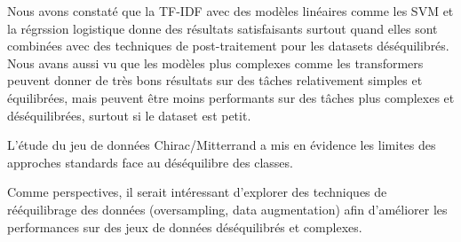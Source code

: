 \documentclass{article}
\begin{document}
Nous avons constaté que la TF-IDF avec des modèles linéaires comme les SVM et la régrssion logistique donne des résultats satisfaisants surtout quand elles sont combinées avec des techniques de post-traitement pour les datasets déséquilibrés. Nous avans aussi vu que les modèles plus complexes comme les transformers peuvent donner de très bons résultats sur des tâches relativement simples et équilibrées, mais peuvent être moins performants sur des tâches plus complexes et déséquilibrées, surtout si le dataset est petit.

L’étude du jeu de données Chirac/Mitterrand a mis en évidence les limites des approches standards face au déséquilibre des classes.

Comme perspectives, il serait intéressant d’explorer des techniques de rééquilibrage des données (oversampling, data augmentation) afin d’améliorer les performances sur des jeux de données déséquilibrés et complexes.
\end{document}
